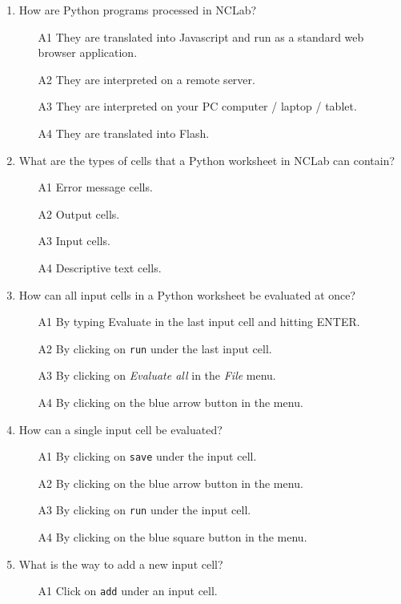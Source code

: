 \documentclass[article,A4,12pt]{llncs}
\begin{document}
\begin{enumerate}
\begin{enumerate}
\end{enumerate}
\item How are Python programs processed in NCLab?
\begin{enumerate}
\item[A1] They are translated into Javascript and run as a standard web browser application.
\item[A2] They are interpreted on a remote server.
\item[A3] They are interpreted on your PC computer / laptop / tablet.
\item[A4] They are translated into Flash.
\end{enumerate}
\item What are the types of cells that a Python worksheet in NCLab can contain?
\begin{enumerate}
\item[A1] Error message cells.
\item[A2] Output cells.
\item[A3] Input cells.
\item[A4] Descriptive text cells.
\end{enumerate}
\item How can all input cells in a Python worksheet be evaluated at once?
\begin{enumerate}
\item[A1] By typing Evaluate in the last input cell and hitting ENTER.
\item[A2] By clicking on {\tt run} under the last input cell.
\item[A3] By clicking on {\em Evaluate all} in the {\em File} menu. 
\item[A4] By clicking on the blue arrow button in the menu.
\end{enumerate}
\item How can a single input cell be evaluated?
\begin{enumerate}
\item[A1] By clicking on {\tt save} under the input cell.
\item[A2] By clicking on the blue arrow button in the menu.
\item[A3] By clicking on {\tt run} under the input cell.
\item[A4] By clicking on the blue square button in the menu.
\end{enumerate}
\item What is the way to add a new input cell?
\begin{enumerate}
\item[A1] Click on {\tt add} under an input cell. 

\end{enumerate}
\end{enumerate}
\end{document}
